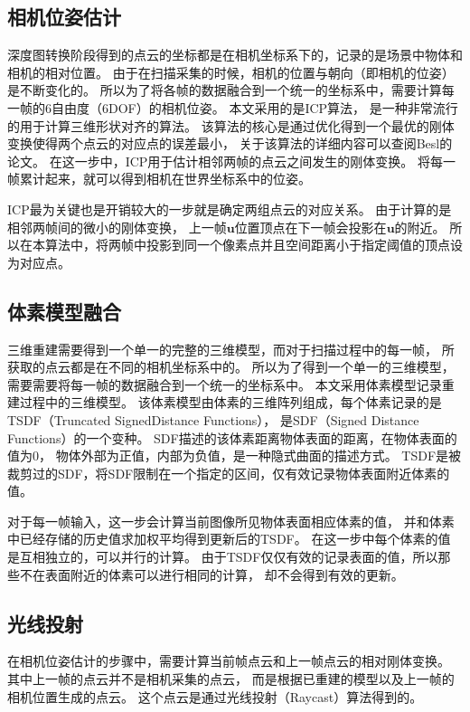 \subsection{相机位姿估计}
深度图转换阶段得到的点云的坐标都是在相机坐标系下的，记录的是场景中物体和相机的相对位置。
由于在扫描采集的时候，相机的位置与朝向（即相机的位姿）是不断变化的。
所以为了将各帧的数据融合到一个统一的坐标系中，需要计算每一帧的6自由度（6DOF）的相机位姿。
本文采用的是ICP算法\cite{besl1992method}，
是一种非常流行的用于计算三维形状对齐的算法。
该算法的核心是通过优化得到一个最优的刚体变换使得两个点云的对应点的误差最小，
关于该算法的详细内容可以查阅Besl的论文\cite{besl1992method}。
在这一步中，ICP用于估计相邻两帧的点云之间发生的刚体变换。
将每一帧累计起来，就可以得到相机在世界坐标系中的位姿。

ICP最为关键也是开销较大的一步就是确定两组点云的对应关系。
由于计算的是相邻两帧间的微小的刚体变换，
上一帧$\mathbf{u}$位置顶点在下一帧会投影在$\mathbf{u}$的附近。
所以在本算法中，将两帧中投影到同一个像素点并且空间距离小于指定阈值的顶点设为对应点。

\subsection{体素模型融合}
三维重建需要得到一个单一的完整的三维模型，而对于扫描过程中的每一帧，
所获取的点云都是在不同的相机坐标系中的。
所以为了得到一个单一的三维模型，需要需要将每一帧的数据融合到一个统一的坐标系中。
本文采用体素模型记录重建过程中的三维模型。
该体素模型由体素的三维阵列组成，每个体素记录的是TSDF（Truncated SignedDistance Functions），
是SDF（Signed Distance Functions）的一个变种。
SDF描述的该体素距离物体表面的距离，在物体表面的值为0，
物体外部为正值，内部为负值，是一种隐式曲面的描述方式。
TSDF是被裁剪过的SDF，将SDF限制在一个指定的区间，仅有效记录物体表面附近体素的值。

对于每一帧输入，这一步会计算当前图像所见物体表面相应体素的值，
并和体素中已经存储的历史值求加权平均得到更新后的TSDF。
在这一步中每个体素的值是互相独立的，可以并行的计算。
由于TSDF仅仅有效的记录表面的值，所以那些不在表面附近的体素可以进行相同的计算，
却不会得到有效的更新。

\subsection{光线投射}
在相机位姿估计的步骤中，需要计算当前帧点云和上一帧点云的相对刚体变换。
其中上一帧的点云并不是相机采集的点云，
而是根据已重建的模型以及上一帧的相机位置生成的点云。
这个点云是通过光线投射（Raycast）算法得到的。

